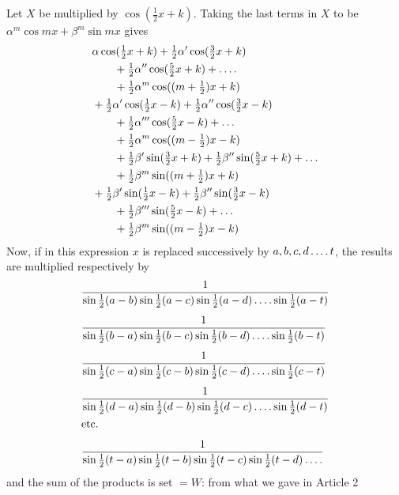 Let $X$ be multiplied by $\cos(\tfrac12x+k)$. Taking the last terms in $X$ to be $\alpha^m\cos mx+\beta^m\sin mx$ gives
\[
\begin{aligned}
&\alpha\cos(\tfrac12x+k)+\tfrac12\alpha'\cos(\tfrac32x+k)\\&\qquad+\tfrac12\alpha''\cos(\tfrac52x+k)+\mathinner{.\,.\,.\,.}\\
&\hspace{2.01em}+\tfrac12\alpha^m\cos((m+\tfrac12)x+k)\\
&+\tfrac12\alpha'\cos(\tfrac12x-k)+\tfrac12\alpha''\cos(\tfrac32x-k)\\&\qquad+\tfrac12\alpha'''\cos(\tfrac52x-k)+\mathinner{.\,.\,.}\\
&\hspace{2.01em}+\tfrac12\alpha^m\cos((m-\tfrac12)x-k)\\
&\hspace{2em}+\tfrac12\beta'\sin(\tfrac32x+k)+\tfrac12\beta''\sin(\tfrac52x+k)+\mathinner{.\,.\,.}\\
&\hspace{2.01em}+\tfrac12\beta^m\sin((m+\tfrac12)x+k)\\
&+\tfrac12\beta'\sin(\tfrac12x-k)+\tfrac12\beta''\sin(\tfrac32x-k)\\&\qquad+\tfrac12\beta'''\sin(\tfrac52x-k)+\mathinner{.\,.\,.}\\
&\hspace{2.01em}+\tfrac12\beta^m\sin((m-\tfrac12)x-k)
\end{aligned}
\]
Now, if in this expression $x$ is replaced successively by $a,b,c,d\mathinner{.\,.\,.\,.}t$, the results
are multiplied respectively by
\[
\begin{aligned}
&\frac{1}{\sin\tfrac12(a-b)\sin\tfrac12(a-c)\sin\tfrac12(a-d)\mathinner{.\,.\,.\,.}\sin\tfrac12(a-t)}\\[1ex]
&\frac{1}{\sin\tfrac12(b-a)\sin\tfrac12(b-c)\sin\tfrac12(b-d)\mathinner{.\,.\,.\,.}\sin\tfrac12(b-t)}\\[1ex]
&\frac{1}{\sin\tfrac12(c-a)\sin\tfrac12(c-b)\sin\tfrac12(c-d)\mathinner{.\,.\,.\,.}\sin\tfrac12(c-t)}\\[1ex]
&\frac{1}{\sin\tfrac12(d-a)\sin\tfrac12(d-b)\sin\tfrac12(d-c)\mathinner{.\,.\,.\,.}\sin\tfrac12(d-t)}\\
&\text{etc.}\\[1ex]
&\frac{1}{\sin\tfrac12(t-a)\sin\tfrac12(t-b)\sin\tfrac12(t-c)\sin\tfrac12(t-d)\mathinner{.\,.\,.\,.}}
\end{aligned}
\]
and the sum of the products is set $=W$: from what we gave in Article 2
